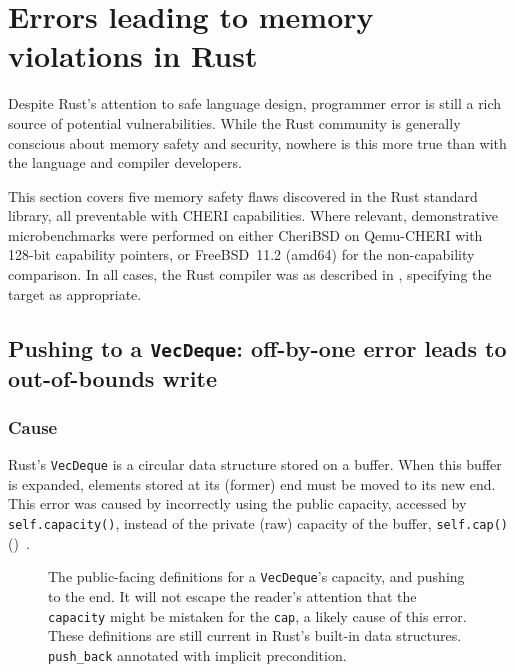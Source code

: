 \documentclass[dissertation.tex]{subfiles}
\begin{document}
\section{Errors leading to memory violations in Rust}
\label{sec:eval-bugs}

Despite Rust's attention to safe language design, programmer error is
still a rich source of potential vulnerabilities.
While the Rust community is generally conscious about memory safety and
security, nowhere is this more true than with the language and compiler
developers.

This section covers five memory safety flaws discovered in the Rust
standard library, all preventable with CHERI capabilities.
Where relevant, demonstrative microbenchmarks were performed on either
CheriBSD on Qemu-CHERI with 128-bit capability pointers, or FreeBSD~11.2
(amd64) for the non-capability comparison.
In all cases, the Rust compiler was as described in
, specifying the target as appropriate.


\subsection{Pushing to a \texttt{VecDeque}: off-by-one error leads to out-of-bounds write}
\label{sec:eval-micro-push}

\subsubsection{Cause}
Rust's \texttt{VecDeque} is a circular data structure stored on a
buffer.
When this buffer is expanded, elements stored at its (former) end must
be moved to its new end.
This error was caused by incorrectly using the public capacity, accessed
by \texttt{self.capacity()}, instead of the private (raw) capacity of
the buffer, \texttt{self.cap()}
()~\cite{rust-pr-reserve,rust-issue-deque-append}.

\begin{figure}[ht]
    
    \caption{
        The public-facing definitions for a \texttt{VecDeque}'s
        capacity, and pushing to the end.
        It will not escape the reader's attention that the
        \texttt{capacity} might be mistaken for the \texttt{cap}, a
        likely cause of this error.
        These definitions are still current in Rust's built-in data
        structures.
        \texttt{push\_back} annotated with implicit precondition.
    }
    \label{lst:deque-defs}
\end{figure}
\end{document}
